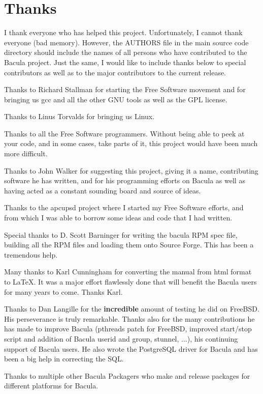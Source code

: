 
\chapter{Thanks}
\label{ThanksChapter}
I thank everyone who has helped this project.  Unfortunately, I cannot
thank everyone (bad memory). However, the AUTHORS file in the main source
code directory should include the names of all persons who have contributed
to the Bacula project. Just the same, I would like to include thanks below
to special contributors as well as to the major contributors to the current
release.

Thanks to Richard Stallman for starting the Free Software movement and for
bringing us gcc and all the other GNU tools as well as the GPL license. 

Thanks to Linus Torvalds for bringing us Linux. 

Thanks to all the Free Software programmers. Without being able to peek at
your code, and in some cases, take parts of it, this project would have been
much more difficult. 

Thanks to John Walker for suggesting this project, giving it a name,
contributing software he has written, and for his programming efforts on
Bacula as well as having acted as a constant sounding board and source of
ideas. 

Thanks to the apcupsd project where I started my Free Software efforts, and
from which I was able to borrow some ideas and code that I had written. 

Special thanks to D. Scott Barninger for writing the bacula RPM spec file,
building all the RPM files and loading them onto Source Forge. This has been a
tremendous help.

Many thanks to Karl Cunningham for converting the manual from html format to
LaTeX. It was a major effort flawlessly done that will benefit the Bacula
users for many years to come. Thanks Karl.

Thanks to Dan Langille for the {\bf incredible} amount of testing he did on
FreeBSD. His perseverance is truly remarkable. Thanks also for the many
contributions he has made to improve Bacula (pthreads patch for FreeBSD,
improved start/stop script and addition of Bacula userid and group, stunnel,
...), his continuing support of Bacula users. He also wrote the PostgreSQL
driver for Bacula and has been a big help in correcting the SQL. 

Thanks to multiple other Bacula Packagers who make and release packages for
different platforms for Bacula. 

